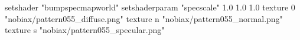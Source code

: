 setshader "bumpspecmapworld"
setshaderparam "specscale" 1.0 1.0 1.0
    texture 0 "nobiax/pattern055_diffuse.png"
    texture n "nobiax/pattern055_normal.png"
    texture s "nobiax/pattern055_specular.png"